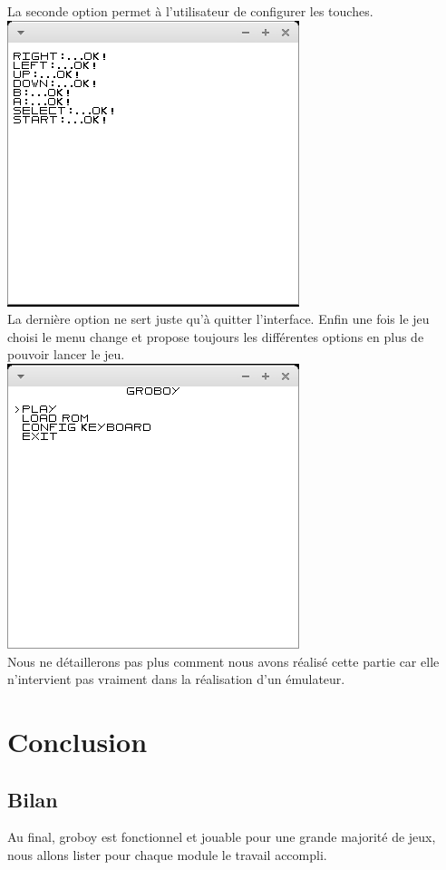 \documentclass{report}
\begin{document}
La seconde option permet à l'utilisateur de configurer les touches.\\
\includegraphics[scale=0.5]{images/screenshot_config.png}\\
La dernière option ne sert juste qu'à quitter l'interface. Enfin une fois le jeu choisi le menu change et propose toujours les différentes options en plus de pouvoir lancer le jeu.\\
\includegraphics[scale=0.5]{images/screenshot_menu2.png}\\
Nous ne détaillerons pas plus comment nous avons réalisé cette partie car elle n'intervient pas vraiment dans la réalisation d'un émulateur.
\chapter*{Conclusion}
\section*{Bilan}
Au final, groboy est fonctionnel et jouable pour une grande majorité de jeux, nous allons lister pour chaque module le travail accompli. 
\end{document}
